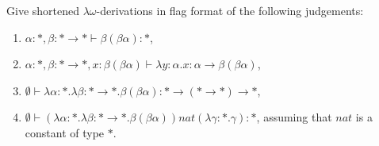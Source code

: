 \begin{problem}{4.4}
    Give shortened $\lambda\omega$-derivations in flag format of the following judgements:
    \begin{enumerate}[label=$(\alph*)$]
    \item $\alpha : *, \beta : * \rightarrow * \vdash \beta(\beta\alpha) : *$,
    \item $\alpha : *, \beta : * \rightarrow *, x : \beta(\beta\alpha) \vdash \lambda y : \alpha . x : \alpha \rightarrow \beta(\beta\alpha)$,
    \item $\emptyset \vdash \lambda \alpha : * . \lambda \beta : * \rightarrow * . \beta(\beta\alpha) : * \rightarrow (* \rightarrow *) \rightarrow *$,
    \item $\emptyset \vdash (\lambda \alpha : * . \lambda \beta : * \rightarrow * . \beta(\beta\alpha)) nat (\lambda \gamma : * . \gamma) : *$, assuming that $nat$ is a constant of type $*$.
    \end{enumerate}
\end{problem}